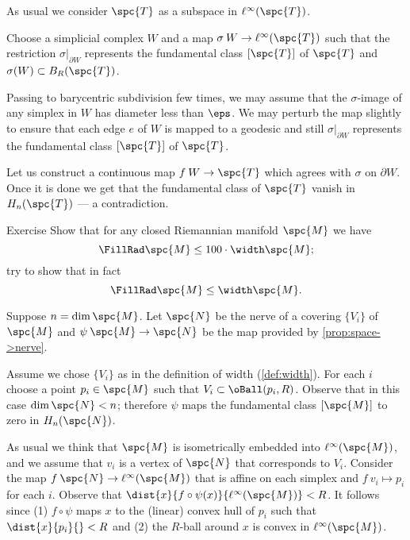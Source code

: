 As usual we consider $\spc{T}$ as a subspace in $\ell^\infty(\spc{T})$.




Choose a simplicial complex $W$ and a map $\sigma\:W\to \ell^\infty(\spc{T})$ such that the restriction $\sigma|_{\partial W}$
represents the fundamental class $[\spc{T}]$ of $\spc{T}$
and $\sigma(W)\subset B_{R}(\spc{T})$.


Passing to barycentric subdivision few times, we may assume that the $\sigma$-image of any simplex in $W$ has diameter less than $\eps$.
We may perturb the map slightly to ensure that each edge $e$ of $W$ is mapped to a geodesic and still $\sigma|_{\partial W}$
represents the fundamental class $[\spc{T}]$ of $\spc{T}$.

Let us construct a continuous map
$f\:W\to  \spc{T}$ which agrees with $\sigma$ on $\partial W$.
Once it is done we get that the fundamental class of $\spc{T}$ vanish in $ H_n(\spc{T})$ --- a contradiction.














\begin{thm}{Exercise}\label{ex:FillRad<width}
Show that for any closed Riemannian manifold $\spc{M}$ we have
\[\FillRad \spc{M}\le 100\cdot \width\spc{M};\]
try to show that in fact
\[\FillRad \spc{M}\le \width\spc{M}.\]

\end{thm}


Suppose $n=\dim \spc{M}$.
Let $\spc{N}$ be the nerve of a covering $\{V_i\}$ of $\spc{M}$ and $\psi\:\spc{M}\to\spc{N}$ be the map provided by \ref{prop:space->nerve}.

Assume we chose $\{V_i\}$ as in the definition of width (\ref{def:width}).
For each $i$ choose a point $p_i\in \spc{M}$ such that $V_i\subset \oBall(p_i,R)$.
Observe that in this case $\dim\spc{N}<n$;
therefore $\psi$ maps the fundamental class $[\spc{M}]$ to zero in $H_n(\spc{N})$.

As usual we think that $\spc{M}$ is isometrically embedded into $\ell^\infty( \spc{M})$, and we assume that $v_i$ is a vertex of $\spc{N}$ that corresponds to $V_i$.
Consider the map $f\:\spc{N}\to \ell^\infty( \spc{M})$ that is affine on each simplex and $f\:v_i\mapsto p_i$ for each $i$.
Observe that $\dist{x}{f\circ\psi(x)}{\ell^\infty( \spc{M})}< R$.
It follows since (1) $f\circ\psi$ maps $x$ to the (linear) convex hull of $p_i$ such that $\dist{x}{p_i}{}<R$ and (2) the $R$-ball around $x$ is convex in $\ell^\infty( \spc{M})$.

